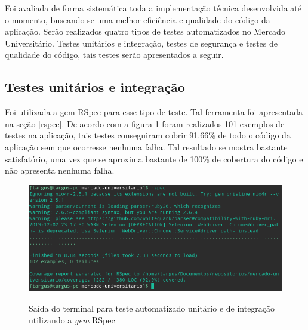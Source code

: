 Foi avaliada de forma sistemática toda a implementação técnica desenvolvida até o momento, buscando-se uma melhor eficiência e qualidade do código da aplicação. Serão realizados quatro tipos de testes automatizados no Mercado Universitário. Testes unitários e integração, testes de segurança e testes de qualidade do código, tais testes serão apresentados a seguir.

\subsection{Testes unitários e integração}
Foi utilizada a gem RSpec para esse tipo de teste. Tal ferramenta foi apresentada na seção \ref{rspec}. De acordo com a figura \ref{fig:rspec} foram realizados 101 exemplos de testes na aplicação, tais testes conseguiram cobrir 91.66\% de todo o código da   aplicação sem que ocorresse nenhuma falha. Tal resultado se mostra bastante satisfatório, uma vez que se aproxima bastante de 100\% de cobertura do código e não apresenta nenhuma falha.
\begin{figure}[htbp!]
  \centering
  \caption{Saída do terminal para teste automatizado unitário e de integração utilizando a \textit{gem} RSpec}
  \includegraphics[width=1\textwidth]{figs/rspec.png}
    \label{fig:rspec}
\end{figure}
